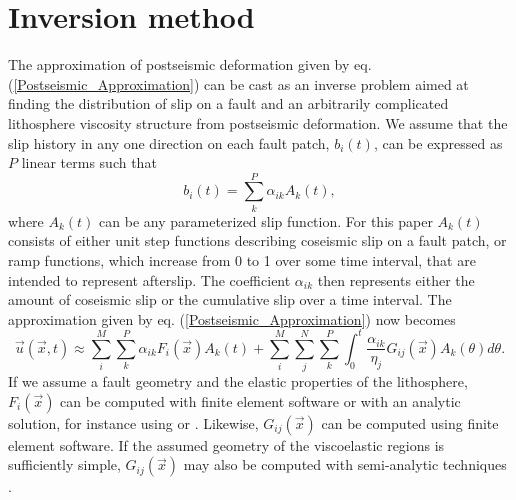 \documentclass[extra,mreferee]{gji}
\begin{document}
\section{Inversion method}\label{InverseMethod}
The approximation of postseismic deformation given by eq.
(\ref{Postseismic_Approximation}) can be cast as an inverse problem
aimed at finding the distribution of slip on a fault and an
arbitrarily complicated lithosphere viscosity structure from
postseismic deformation. We assume that the slip history in any one
direction on each fault patch, $b_i(t)$, can be expressed as $P$ linear
terms such that
\begin{equation}
  b_i(t) = \sum_k^P \alpha_{ik}A_k(t),
\end{equation}
where $A_k(t)$ can be any parameterized slip function.  For this
paper $A_k(t)$ consists of either unit step functions describing
coseismic slip on a fault patch, or ramp functions, which increase
from 0 to 1 over some time interval, that are intended to represent
afterslip.  The coefficient $\alpha_{ik}$ then represents either the
amount of coseismic slip or the cumulative slip over a time interval.
The approximation given by eq. (\ref{Postseismic_Approximation}) now
becomes
\begin{equation}\label{Postseismic_Approximation2}
  \vec{u}(\vec{x},t) \approx
  \sum_i^M\sum_k^P\alpha_{ik}F_i(\vec{x})A_k(t) +
  \sum_i^M\sum_j^N\sum_k^P\int_0^t\frac{\alpha_{ik}}{\eta_j}G_{ij}(\vec{x})A_k(\theta)d\theta.
\end{equation}
If we assume a fault geometry and the elastic properties of the
lithosphere, $F_i(\vec{x})$ can be computed with finite element
software or with an analytic solution, for instance using
\citet{O1992} or \citet{M2007}. Likewise, $G_{ij}(\vec{x})$ can be
computed using finite element software.  If the assumed geometry of
the viscoelastic regions is sufficiently simple, $G_{ij}(\vec{x})$ may
also be computed with semi-analytic techniques
\citep[e.g.][]{P1997,FM2006,BF2010}.
\end{document}
